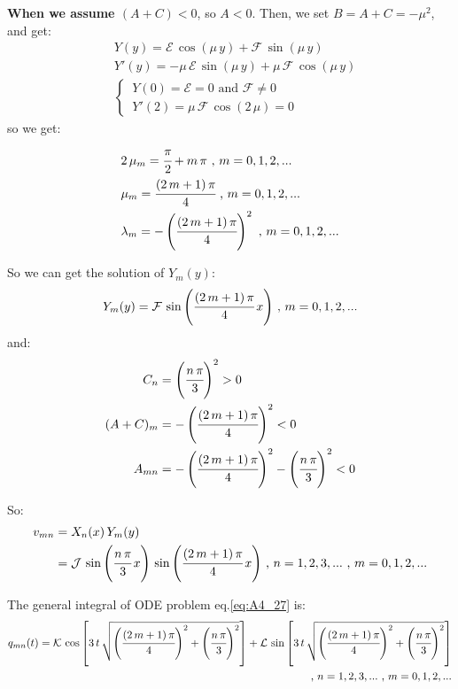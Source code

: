 \documentclass[../main.tex]{subfiles}
\begin{document}
\textbf{When we assume $(A + C) < 0$}, so $A < 0$. Then, we set $B = A + C = - \mu^2 $, and get:
\begin{align}
    & Y(y) = \mathcal{E} \, \cos{(\mu \, y)} + \mathcal{F} \, \sin{(\mu \, y)} \\
    & Y'(y) = - \mu \, \mathcal{E} \, \sin{(\mu \, y)} + \mu \, \mathcal{F} \, \cos{(\mu \, y)} \\
    & \begin{cases}
        \, Y(0) = \mathcal{E} = 0 \text{ and  } \mathcal{F} \neq 0 \\
        \, Y'(2) = \mu \, \mathcal{F} \, \cos{(2 \, \mu)} = 0
    \end{cases}
\end{align}
so we get:
\begin{align}
    & 2 \, \mu_m = \cfrac{\pi}{2} + m \, \pi \text{ ,  } m = 0, 1, 2, ... \\
    & \mu_m = \cfrac{(2 \, m + 1) \, \pi}{4} \text{ ,  } m = 0, 1, 2, ... \\
    & \lambda_m = - \left(\cfrac{(2 \, m + 1) \, \pi}{4} \right)^2 \text{ ,  } m = 0, 1, 2, ...
\end{align}

So we can get the solution of $Y_m(y)$:
\begin{equation}
    Y_m(y) = \mathcal{F} \, \sin{\left(\cfrac{(2 \, m + 1) \, \pi}{4} \, x \right)} \text{ ,  } m = 0, 1, 2, ...
\end{equation}
and:
\begin{align}
    C_n &= \left(\cfrac{n \, \pi}{3} \right)^2 > 0 \\
    (A + C)_m &= - \left(\cfrac{(2 \, m + 1) \, \pi}{4} \right)^2 < 0 \\
    A_{mn} &= - \left(\cfrac{(2 \, m + 1) \, \pi}{4} \right)^2 - \left(\cfrac{n \, \pi}{3} \right)^2 < 0
\end{align}

So:
\begin{align}
    v_{mn} &= X_n(x) \, Y_m(y) \nonumber \\
    &= \mathcal{J} \, \sin{\left(\cfrac{n \, \pi}{3} \, x \right)} \, \sin{\left(\cfrac{(2 \, m + 1) \, \pi}{4} \, x \right)} \text{ ,  } n = 1, 2, 3, ... \text{ ,  } m = 0, 1, 2, ...
\end{align}

The general integral of ODE problem eq.\ref{eq:A4_27} is:
\begin{align}
    q_{mn}(t) = \mathcal{K} \, \cos{\left[3 \, t \, \sqrt{\left(\cfrac{(2 \, m + 1) \, \pi}{4} \right)^2 + \left(\cfrac{n \, \pi}{3} \right)^2} \right]} + \mathcal{L} \, \sin{\left[3 \, t \, \sqrt{\left(\cfrac{(2 \, m + 1) \, \pi}{4} \right)^2 + \left(\cfrac{n \, \pi}{3} \right)^2} \right]} \\
    \text{ ,  } n = 1, 2, 3, ... \text{ ,  } m = 0, 1, 2, ... \nonumber
\end{align}
\end{document}
